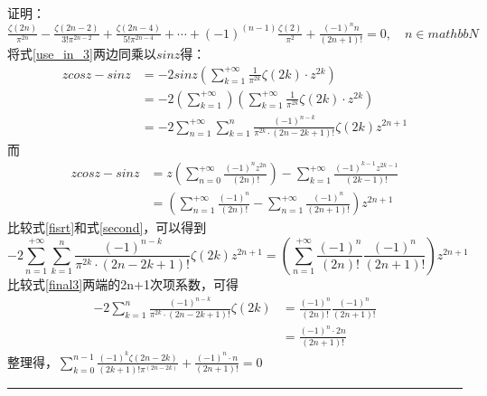 \documentclass[18pt]{article}
\begin{document}
\section{}
证明：$\frac{\zeta(2n)}{\pi^{2n}}-\frac{\zeta(2n-2)}{3!\pi^{2n-2}}+\frac{\zeta(2n-4)}{5!\pi^{2n-4}}+ \cdots+(-1)^(n-1)\frac{\zeta(2)}{\pi^{2}}+\frac{(-1)^n n}{(2n+1)!}=0, \quad n\in mathbb{N}$\\
将式\eqref{use_in_3}两边同乘以$sinz$得：
\begin{equation}
\begin{split}
	zcosz-sinz &=-2sinz(\sum\limits_{k=1}^{+\infty}\frac{1}{\pi^{2k}}\zeta(2k) \cdot z^{2k})\\
			   &=-2(\sum\limits_{k=1}^{+\infty})(\sum\limits_{k=1}^{+\infty}\frac{1}{\pi^{2k}}\zeta(2k) \cdot z^{2k})\\
			   &=-2\sum\limits_{n=1}^{+\infty} \sum\limits_{k=1}^{n} \frac{(-1)^{n-k}}{\pi^{2k} \cdot (2n-2k+1)!} \zeta(2k) z^{2n+1}
			   \label{fisrt}
\end{split}
\end{equation}
而
\begin{equation}
\begin{split}
	zcosz-sinz &=z(\sum\limits_{n=0}^{+\infty} \frac{(-1)^n z^{2n}}{(2n)!}) -\sum\limits_{k=1}^{+\infty}\frac{(-1)^{k-1}z^{2k-1}}{(2k-1)!}\label{second}\\
			   &=(\sum\limits_{n=1}^{+\infty}\frac{(-1)^n}{(2n)!} - \sum\limits_{n=1}^{+\infty} \frac{(-1)^n}{(2n+1)!})z^{2n+1}
\end{split}
\end{equation}
比较式\eqref{fisrt}和式\eqref{second}，可以得到
\begin{equation}
	-2\sum\limits_{n=1}^{+\infty} \sum\limits_{k=1}^{n} \frac{(-1)^{n-k}}{\pi^{2k} \cdot (2n-2k+1)!} \zeta(2k) z^{2n+1}=(\sum\limits_{n=1}^{+\infty}\frac{(-1)^n}{(2n)!}  \frac{(-1)^n}{(2n+1)!})z^{2n+1} \label{final3}
\end{equation}
比较式\eqref{final3}两端的2n+1次项系数，可得
\begin{align*}
-2\sum\limits_{k=1}^{n} \frac{(-1)^{n-k}}{\pi^{2k} \cdot (2n-2k+1)!} \zeta(2k) &= \frac{(-1)^n}{(2n)!}  \frac{(-1)^n}{(2n+1)!} \\
     &= \frac{(-1)^n \cdot 2n}{(2n+1)!}
\end{align*}
整理得，$\sum\limits_{k=0}^{n-1} \frac{(-1)^k \zeta(2n-2k)}{(2k+1)! \pi^(2n-2k)} + \frac{(-1)^n \cdot n}{(2n+1)!} =0$ \quad \rule{3mm}{3mm}\\
\end{document}
